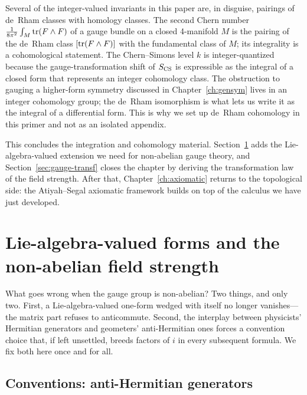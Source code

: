 \begin{remark}\label{rem:deRham-physics}
Several of the integer-valued invariants in this paper are, in disguise, pairings of de~Rham classes with homology classes. The second Chern number $\tfrac{1}{8\pi^2}\int_M \operatorname{tr}(F \wedge F)$ of a gauge bundle on a closed 4-manifold $M$ is the pairing of the de~Rham class $[\operatorname{tr}(F \wedge F)]$ with the fundamental class of $M$; its integrality is a cohomological statement. The Chern--Simons level $k$ is integer-quantized because the gauge-transformation shift of $S_{\operatorname{CS}}$ is expressible as the integral of a closed form that represents an integer cohomology class. The obstruction to gauging a higher-form symmetry discussed in Chapter~\ref{ch:gensym} lives in an integer cohomology group; the de~Rham isomorphism is what lets us write it as the integral of a differential form. This is why we set up de~Rham cohomology in this primer and not as an isolated appendix.
\end{remark}

\medskip

\noindent This concludes the integration and cohomology material. Section~\ref{sec:lie-forms} adds the Lie-algebra-valued extension we need for non-abelian gauge theory, and Section~\ref{sec:gauge-transf} closes the chapter by deriving the transformation law of the field strength. After that, Chapter~\ref{ch:axiomatic} returns to the topological side: the Atiyah--Segal axiomatic framework builds on top of the calculus we have just developed.


\section{Lie-algebra-valued forms and the non-abelian field strength}\label{sec:lie-forms}

What goes wrong when the gauge group is non-abelian? Two things, and only two. First, a Lie-algebra-valued one-form wedged with itself no longer vanishes---the matrix part refuses to anticommute. Second, the interplay between physicists' Hermitian generators and geometers' anti-Hermitian ones forces a convention choice that, if left unsettled, breeds factors of $i$ in every subsequent formula. We fix both here once and for all.

\subsection{Conventions: anti-Hermitian generators}\label{sec:anti-hermitian-conv}

